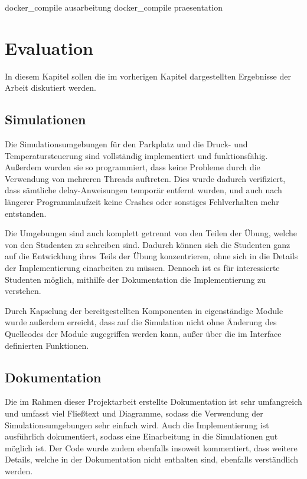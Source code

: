 \documentclass[oneside]{elaboration}
\begin{document}
\begin{bashcode}
    docker_compile ausarbeitung
    docker_compile praesentation
\end{bashcode}

\chapter{Evaluation}
\label{chp:evaluation}

In diesem Kapitel sollen die im vorherigen Kapitel dargestellten Ergebnisse der
Arbeit diskutiert werden.

\section{Simulationen}
\label{sec:simulationen}

Die Simulationsumgebungen für den Parkplatz und die Druck- und
Temperatursteuerung sind vollständig implementiert und funktionsfähig. Außerdem
wurden sie so programmiert, dass keine Probleme durch die Verwendung von
mehreren Threads auftreten. Dies wurde dadurch verifiziert, dass sämtliche
delay-Anweisungen temporär entfernt wurden, und auch nach längerer
Programmlaufzeit keine Crashes oder sonstiges Fehlverhalten mehr entstanden.

Die Umgebungen sind auch komplett getrennt von den Teilen der Übung, welche von
den Studenten zu schreiben sind. Dadurch können sich die Studenten ganz auf die
Entwicklung ihres Teils der Übung konzentrieren, ohne sich in die Details der
Implementierung einarbeiten zu müssen. Dennoch ist es für interessierte
Studenten möglich, mithilfe der Dokumentation die Implementierung zu verstehen.

Durch Kapselung der bereitgestellten Komponenten in eigenständige Module wurde
außerdem erreicht, dass auf die Simulation nicht ohne Änderung des Quellcodes
der Module zugegriffen werden kann, außer über die im Interface definierten
Funktionen.

\section{Dokumentation}
\label{sec:dokumentation}

Die im Rahmen dieser Projektarbeit erstellte Dokumentation ist sehr umfangreich
und umfasst viel Fließtext und Diagramme, sodass die Verwendung der
Simulationsumgebungen sehr einfach wird. Auch die Implementierung ist
ausführlich dokumentiert, sodass eine Einarbeitung in die Simulationen gut
möglich ist. Der Code wurde zudem ebenfalls insoweit kommentiert, dass weitere
Details, welche in der Dokumentation nicht enthalten sind, ebenfalls
verständlich werden.
\end{document}
